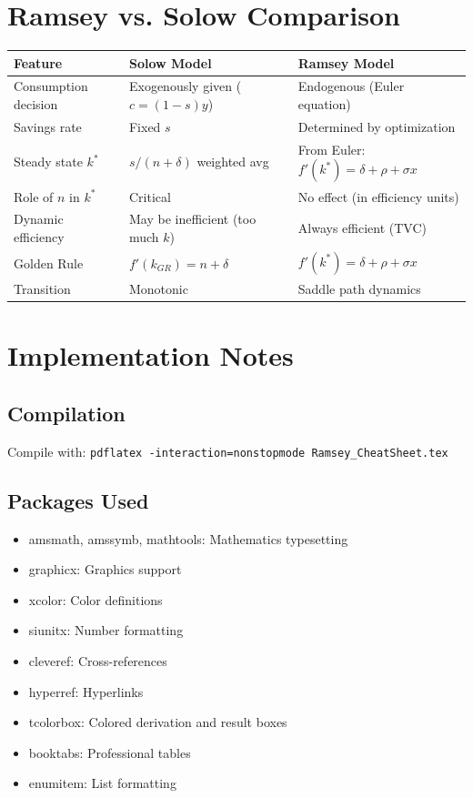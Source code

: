 \documentclass[a4paper,11pt]{article}
\begin{document}
\section{Ramsey vs. Solow Comparison}

\begin{center}
\begin{tabular}{lll}
\toprule
Feature & Solow Model & Ramsey Model \\
\midrule
Consumption decision & Exogenously given ($c = (1-s)y$) & Endogenous (Euler equation) \\
Savings rate & Fixed $s$ & Determined by optimization \\
Steady state $k^*$ & $s/(n+\delta)$ weighted avg & From Euler: $f'(k^*) = \delta + \rho + \sigma x$ \\
Role of $n$ in $k^*$ & Critical & No effect (in efficiency units) \\
Dynamic efficiency & May be inefficient (too much $k$) & Always efficient (TVC) \\
Golden Rule & $f'(k_{GR}) = n + \delta$ & $f'(k^*) = \delta + \rho + \sigma x$ \\
Transition & Monotonic & Saddle path dynamics \\
\bottomrule
\end{tabular}
\end{center}

\clearpage
\section{Implementation Notes}

\subsection*{Compilation}
Compile with: \texttt{pdflatex -interaction=nonstopmode Ramsey\_CheatSheet.tex}

\subsection*{Packages Used}
\begin{itemize}
    \item amsmath, amssymb, mathtools: Mathematics typesetting
    \item graphicx: Graphics support
    \item xcolor: Color definitions
    \item siunitx: Number formatting
    \item cleveref: Cross-references
    \item hyperref: Hyperlinks
    \item tcolorbox: Colored derivation and result boxes
    \item booktabs: Professional tables
    \item enumitem: List formatting
\end{itemize}
\end{document}
